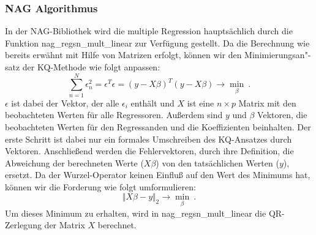 \subsubsection{NAG Algorithmus}

In der NAG-Bibliothek wird die multiple Regression hauptsächlich durch die Funktion nag\_regsn\_mult\_linear zur Verfügung gestellt.
Da die Berechnung wie bereits erwähnt mit Hilfe von Matrizen erfolgt, können wir den Minimierungsan"-satz der KQ-Methode wie folgt anpassen:
\begin{equation*}
  \label{eq:minimization}
  \sum\limits^{N}_{n=1} \epsilon^2_n = \epsilon^T \epsilon = (y - X \beta)^T (y - X \beta) \rightarrow \min\limits_{\beta} ~.
\end{equation*}
$\epsilon$ ist dabei der Vektor, der alle $\epsilon_i$ enthält und $X$ ist eine $n \times p$ Matrix mit den beobachteten Werten für alle Regressoren.
Außerdem sind $y$ und $\beta$ Vektoren, die beobachteten Werten für den Regressanden und die Koeffizienten beinhalten. 
Der erste Schritt ist dabei nur ein formales Umschreiben des KQ-Ansatzes durch Vektoren.
Anschließend werden die Fehlervektoren, durch ihre Definition, die Abweichung der berechneten Werte ($X\beta$) von den tatsächlichen Werten ($y$), ersetzt.
Da der Wurzel-Operator keinen Einfluß auf den Wert des Minimums hat, können wir die Forderung wie folgt umformulieren:
\begin{equation*}
  \label{eq:minimization_general}
  \Vert X\beta - y \Vert_2 \rightarrow \min\limits_{\beta} ~.
\end{equation*}
Um dieses Minimum zu erhalten, wird in nag\_regsn\_mult\_linear die QR-Zerlegung der Matrix $X$ berechnet.

